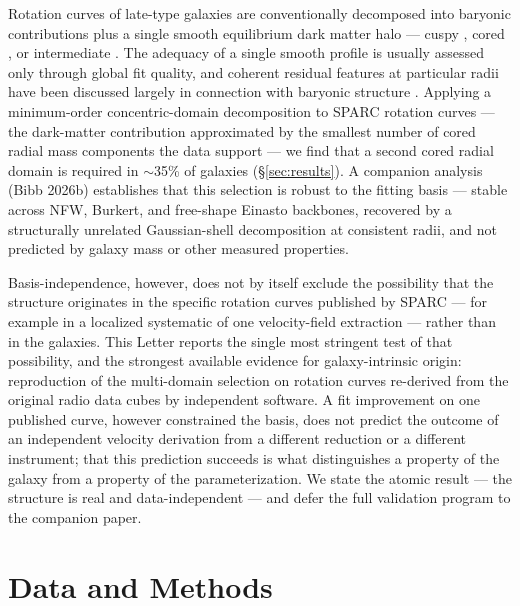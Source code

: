 \documentclass[twocolumn]{aastex701}
\begin{document}
Rotation curves of late-type galaxies are conventionally decomposed into
baryonic contributions plus a single smooth equilibrium dark matter halo ---
cuspy \citep[NFW;][]{Navarro1996}, cored \citep[Burkert;][]{Burkert1995}, or
intermediate \citep[Einasto;][]{Einasto1965}. The adequacy of a single smooth
profile is usually assessed only through global fit quality, and coherent
residual features at particular radii have been discussed largely in connection
with baryonic structure \citep[``Renzo's rule'';][]{Sancisi2004}. Applying a
minimum-order concentric-domain decomposition to SPARC rotation curves
\citep{Lelli2016} --- the dark-matter contribution approximated by the smallest number
of cored radial mass components the data support --- we find that a second cored radial
domain is required in $\sim$35\% of galaxies (\S\ref{sec:results}). A companion
analysis (Bibb 2026b) establishes that this selection is robust to the fitting basis
--- stable across NFW, Burkert, and free-shape Einasto backbones, recovered by a
structurally unrelated Gaussian-shell decomposition at consistent radii, and not
predicted by galaxy mass or other measured properties.

Basis-independence, however, does not by itself exclude the possibility that the
structure originates in the specific rotation curves published by SPARC --- for
example in a localized systematic of one velocity-field extraction --- rather
than in the galaxies. This Letter reports the single most stringent test of that
possibility, and the strongest available evidence for galaxy-intrinsic origin:
reproduction of the multi-domain selection on rotation curves re-derived from the
original radio data cubes by independent software. A fit improvement on one
published curve, however constrained the basis, does not predict the outcome of
an independent velocity derivation from a different reduction or a different
instrument; that this prediction succeeds is what distinguishes a property of the
galaxy from a property of the parameterization. We state the atomic result --- the
structure is real and data-independent --- and defer the full validation program
to the companion paper.

\section{Data and Methods} \label{sec:methods}
\end{document}
